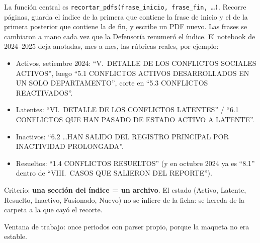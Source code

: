 \documentclass[11pt,a4paper]{article}
\begin{document}
La función central es \texttt{recortar\_pdfs(frase\_inicio, frase\_fin, \ldots)}. Recorre páginas, guarda el índice de la primera que contiene la frase de inicio y el de la primera posterior que contiene la de fin, y escribe un PDF nuevo. Las frases se cambiaron a mano cada vez que la Defensoría renumeró el índice. El notebook de 2024--2025 deja anotadas, mes a mes, las rúbricas reales, por ejemplo:

\begin{itemize}
  \item Activos, setiembre 2024: ``V.\ DETALLE DE LOS CONFLICTOS SOCIALES ACTIVOS'', luego ``5.1 CONFLICTOS ACTIVOS DESARROLLADOS EN UN SOLO DEPARTAMENTO'', corte en ``5.3 CONFLICTOS REACTIVADOS''.
  \item Latentes: ``VI.\ DETALLE DE LOS CONFLICTOS LATENTES'' / ``6.1 CONFLICTOS QUE HAN PASADO DE ESTADO ACTIVO A LATENTE''.
  \item Inactivos: ``6.2 \ldots HAN SALIDO DEL REGISTRO PRINCIPAL POR INACTIVIDAD PROLONGADA''.
  \item Resueltos: ``1.4 CONFLICTOS RESUELTOS'' (y en octubre 2024 ya es ``8.1'' dentro de ``VIII.\ CASOS QUE SALIERON DEL REPORTE'').
\end{itemize}

Criterio: \textbf{una sección del índice = un archivo}. El estado (Activo, Latente, Resuelto, Inactivo, Fusionado, Nuevo) no se infiere de la ficha: se hereda de la carpeta a la que cayó el recorte.

Ventana de trabajo: once periodos con parser propio, porque la maqueta no era estable.
\end{document}
